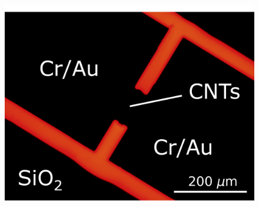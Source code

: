 \documentclass[
  a4paper,
]{scrbook}
\begin{document}
\begin{figure}
\begin{minipage}[t]{0.47\linewidth}
{{\includegraphics{figures/ch7/modified_C1_ch5_mCherry_10sexposure_highcontrast_12.6X.png}

}

}

\subcaption{\label{fig-aptamer-photoresist-2}}
\end{minipage}%
\newline
\begin{minipage}[t]{0.47\linewidth}

{\centering 

}
\end{minipage}
\end{figure}
\end{document}
